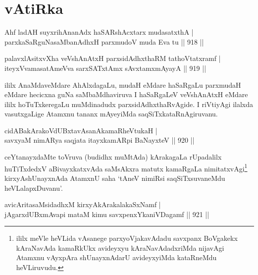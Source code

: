 \section*{vAtiRka}

\begin{shl}
Ahf ladAH suyxrihA\s \s nanAdx haSARshAcxtarx mudasatxthA | \\
parxkaSaRguNasaMbanAdhxH parxmudoV muda Eva tu \hfill||  918 ||  
\end{shl}
				
\begin{shl}
palavxlAsitxvXha veVshAnAtxH parxsidAdhxthaRM tathoVtatxramf | \\
iteyxVvamasatAmeVva sarxSATx\s \s tAmx sAvxtamxmAyayA \hfill||  919 || 
\end{shl}

\begin{artha}
ililx AnaMdaveMdare AhAlxdagaLu, mudaH eMdare haSaRgaLu parxmudaH eMdare hecicxna guNa saMbaMdhaviruva I haSaRgaLeV veVshAnAtxH eMdare ililx hoTuTxkeregaLu muMdinadudx parxsidAdhxthaRvAgide. I riVtiyAgi ilalxda vasutxgaLige Atamxnu tananx mAyeyiMda saqSiTxkataRnAgiruvanu.
\end{artha}


\begin{shl}
cidABakArakoVdUBxtavAsanAkamaRheVtukaH | \\
savxyaM nimARya saqjata itayxkamARpi BaNayxteV \hfill||  920 ||  
\end{shl}

\begin{artha}
ceYtanayxdaMte toVruva (budidhx muMtAda) kArakagaLa rUpadalilx huTiTxdedxV aBivayxkatxvAda saMsAkxra matutx kamaRgaLa nimitatxvAgi\footnote{ililx meVle heVLida vAsanege parxyoVjakavAdadu savxpanx BoVgakekx kAraNavAda kamaRkUkx avideyxyu kAraNavAdadxriMda nijavAgi Atamxnu vAyxpAra shUnayxnAdarU avideyxyiMda kataRneMdu heVLiruvudu.} kirxyAshUnayxnAda AtamxnU saha `tAneV nimiRsi saqSiTxsuvaneMdu heVLalapxDuvanu'.
\end{artha}


\begin{shl}
avicAritasaMsidadhxM kirxyAkArakalakaSxNamf | \\
jAgarxdUBxmAvapi mataM kimu savxpenxYkaniVDagamf \hfill||  921 ||  
\end{shl}

